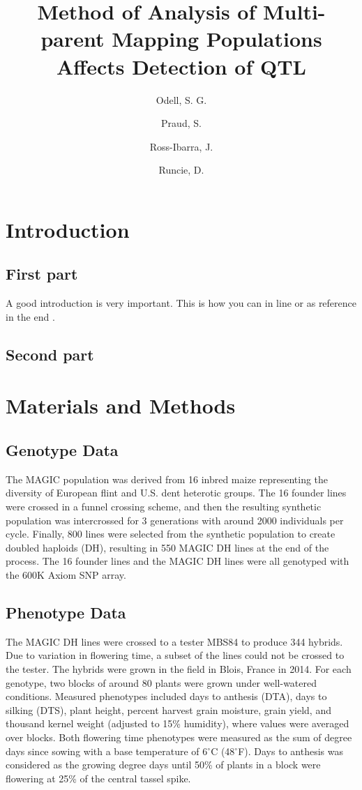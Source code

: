 \documentclass[9pt,twocolumn,twoside]{rilabRxiv}
\title{Method of Analysis of Multi-parent Mapping Populations Affects Detection of QTL}
\author[$\ast$,1]{Odell, S. G.}
\author[$\dagger$]{Praud, S.}
\author[$\ast$,$\ddagger$]{Ross-Ibarra, J.}
\author[$\ast$,$\ddagger$]{Runcie, D.}
\affil[$\ast$]{Dept. of Plant Sciences and Center for Population Biology, University of California, Davis, CA, USA}
\affil[$\dagger$]{Biogemma, Chappes, France}
\affil[$\ddagger$]{Genome Center, University of California, Davis, CA, USA}
\begin{document}
\maketitle
\thispagestyle{firststyle}
{}
\vspace{-11pt}%

\section{Introduction}
\subsection{First part}

\lettrine[lines=2]{\color{color2}A}{} good introduction is very important.
This is how you can \citet{hufford2012comparative} in line or as reference in the end \citep{bourne2017ten}.
\subsection{Second part}
\blindtext
\section{Materials and Methods}
\label{sec:materials:methods}
\subsection{Genotype Data}
The MAGIC population was derived from 16 inbred maize representing the diversity of European flint and U.S. dent heterotic groups. The 16 founder lines were crossed in a funnel crossing scheme, and then the resulting synthetic population was intercrossed for 3 generations with around 2000 individuals per cycle. Finally, 800 lines were selected from the synthetic population to create doubled haploids (DH), resulting in 550 MAGIC DH lines at the end of the process. The 16 founder lines and the MAGIC DH lines were all genotyped with the 600K Axiom SNP array.
\subsection{Phenotype Data}
The MAGIC DH lines were crossed to a tester MBS84 to produce 344 hybrids. Due to variation in flowering time, a subset of the lines could not be crossed to the tester. The hybrids were grown in the field in Blois, France in 2014. For each genotype, two blocks of around 80 plants were grown under well-watered conditions. 
Measured phenotypes included days to anthesis (DTA), days to silking (DTS), plant height, percent harvest grain moisture, grain yield, and thousand kernel weight (adjusted to 15\% humidity), where values were averaged over blocks. Both flowering time phenotypes were measured as the sum of degree days since sowing with a base temperature of 6$^{\circ}$C (48$^{\circ}$F). Days to anthesis was considered as the growing degree days until 50\% of plants in a block were flowering at 25\% of the central tassel spike.
\end{document}
